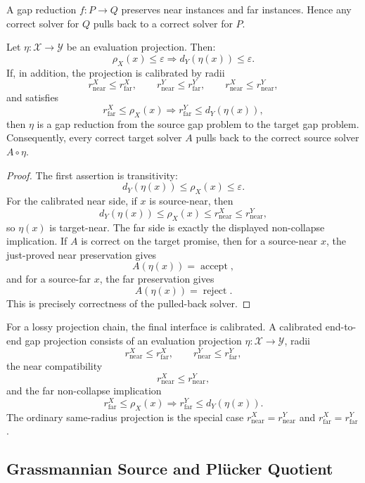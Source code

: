 A gap reduction \(f:P\to Q\) preserves near instances and far instances. Hence
any correct solver for \(Q\) pulls back to a correct solver for \(P\).

\begin{proposition}\label{prop:projection-pullback}
Let \(\eta:\mathcal X\to\mathcal Y\) be an evaluation projection.
Then:
\[
  \rho_X(x)\le\varepsilon\Longrightarrow d_Y(\eta(x))\le\varepsilon.
\]
If, in addition, the projection is calibrated by radii
\[
  r^X_{\mathrm{near}}\le r^X_{\mathrm{far}},
  \qquad
  r^Y_{\mathrm{near}}\le r^Y_{\mathrm{far}},
  \qquad
  r^X_{\mathrm{near}}\le r^Y_{\mathrm{near}},
\]
and satisfies
\[
  r^X_{\mathrm{far}}\le\rho_X(x)
  \Longrightarrow
  r^Y_{\mathrm{far}}\le d_Y(\eta(x)),
\]
then \(\eta\) is a gap reduction from the source gap problem to the target gap
problem. Consequently, every correct target solver \(A\) pulls back to the
correct source solver \(A\circ\eta\).
\end{proposition}

\begin{proof}
The first assertion is transitivity:
\[
  d_Y(\eta(x))\le\rho_X(x)\le\varepsilon.
\]
For the calibrated near side, if \(x\) is source-near, then
\[
  d_Y(\eta(x))
  \le \rho_X(x)
  \le r^X_{\mathrm{near}}
  \le r^Y_{\mathrm{near}},
\]
so \(\eta(x)\) is target-near. The far side is exactly the displayed
non-collapse implication. If \(A\) is correct on the target promise, then for
a source-near \(x\), the just-proved near preservation gives
\[
  A(\eta(x))=\operatorname{accept},
\]
and for a source-far \(x\), the far preservation gives
\[
  A(\eta(x))=\operatorname{reject}.
\]
This is precisely correctness of the pulled-back solver.
\end{proof}

For a lossy projection chain, the final interface is calibrated. A calibrated
end-to-end gap projection consists of an evaluation projection
\(\eta:\mathcal X\to\mathcal Y\), radii
\[
  r^X_{\mathrm{near}}\le r^X_{\mathrm{far}},
  \qquad
  r^Y_{\mathrm{near}}\le r^Y_{\mathrm{far}},
\]
the near compatibility
\[
  r^X_{\mathrm{near}}\le r^Y_{\mathrm{near}},
\]
and the far non-collapse implication
\[
  r^X_{\mathrm{far}}\le \rho_X(x)
  \Longrightarrow
  r^Y_{\mathrm{far}}\le d_Y(\eta(x)).
\]
The ordinary same-radius projection is the special case
\(r^X_{\mathrm{near}}=r^Y_{\mathrm{near}}\) and
\(r^X_{\mathrm{far}}=r^Y_{\mathrm{far}}\).

\subsection{Grassmannian Source and Pl\"ucker Quotient}

